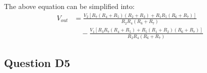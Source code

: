 \documentclass{article}
\begin{document}
The above equation can be simplified into:
\begin{equation}
    \begin{aligned}
        V_{out}
        &=
        \frac{
            V_2\left[
                R_7(R_4+R_5)(R_2+R_3)
                + R_1R_5(R_6+R_7)
            \right]
        }{
            R_2R_4(R_6+R_7)
        }
        \\[2mm]
        &\quad -
        \frac{
            V_1\left[
                R_3R_7(R_4+R_5)
                + R_5(R_1+R_2)(R_6+R_7)
            \right]
        }{
            R_2R_4(R_6+R_7)
        }
    \end{aligned}
\end{equation}

\subsection{Question D5}
\end{document}

